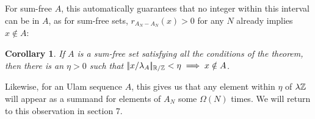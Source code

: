 \documentclass{report}
\newtheorem{corollary}{Corollary}[theorem]
\theoremstyle{remark}
\numberwithin{equation}{section}
\begin{document}
For sum-free $A$, this automatically guarantees that no integer within
this interval can be in $A$, as for sum-free sets, $r_{A_N-A_N}(x) >
0$ for any $N$ already implies $x \notin A$: 

\begin{corollary}
If $A$ is a sum-free set satisfying all the conditions of the theorem,
then there is an $\eta > 0$ such that $|\!|x/\lambda_A|\!|_{\mathbb{R}/\mathbb{Z}} < \eta
\implies x \notin A$.  
\end{corollary}

Likewise, for an Ulam sequence $A$, this gives us that any element
within $\eta$ of $\lambda\mathbb{Z}$ will appear as a summand for elements of
$A_N$ some $\Omega(N)$ times.  We will return to this observation in
section 7.  










\end{document}
